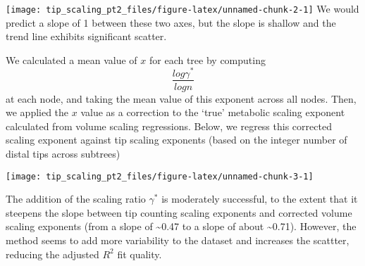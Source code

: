 \documentclass[]{article}
\begin{document}
\texttt{[image: tip\_scaling\_pt2\_files/figure-latex/unnamed-chunk-2-1]}
We would predict a slope of 1 between these two axes, but the slope is
shallow and the trend line exhibits significant scatter.

We calculated a mean value of \(x\) for each tree by computing
\[\frac{log \gamma^{*}}{log n}\] at each node, and taking the mean value
of this exponent across all nodes. Then, we applied the \(x\) value as a
correction to the `true' metabolic scaling exponent calculated from
volume scaling regressions. Below, we regress this corrected scaling
exponent against tip scaling exponents (based on the integer number of
distal tips across subtrees)

\texttt{[image: tip\_scaling\_pt2\_files/figure-latex/unnamed-chunk-3-1]}

The addition of the scaling ratio \(\gamma^{*}\) is moderately
successful, to the extent that it steepens the slope between tip
counting scaling exponents and corrected volume scaling exponents (from
a slope of \textasciitilde{}0.47 to a slope of about
\textasciitilde{}0.71). However, the method seems to add more
variability to the dataset and increases the scattter, reducing the
adjusted \(R^{2}\) fit quality.
\end{document}
